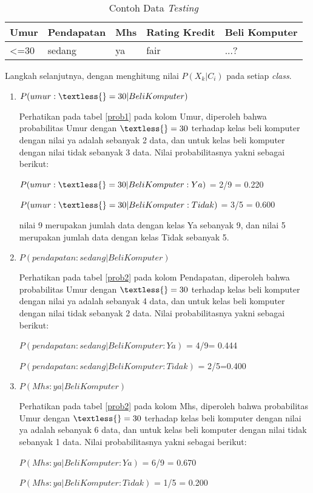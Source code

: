 \begin{table}[!ht]
\centering
\caption{Contoh Data \textit{Testing}}
\label{testing}
\begin{tabular}{|l|l|l|l|l|}
\hline
Umur           & Pendapatan & Mhs & Rating Kredit & Beli Komputer \\ \hline
\textless{}=30 & sedang     & ya  & fair          & ...?          \\ \hline
\end{tabular}
\end{table}
\par Langkah selanjutnya, dengan menghitung nilai $P(X_{k}|C_{i})$ pada setiap \textit{class}.

\begin{enumerate}
    \item $P(umur :\textless{}=30|Beli Komputer)$
    \par Perhatikan pada tabel \ref{prob1} pada kolom Umur, diperoleh bahwa probabilitas Umur dengan $\textless{}=30$ terhadap kelas beli komputer dengan nilai ya adalah sebanyak 2 data, dan untuk kelas beli komputer dengan nilai tidak sebanyak 3 data. Nilai probabilitasnya yakni sebagai berikut:
\par $P(umur :\textless{}=30|Beli Komputer:Ya)$ = 2/9 = 0.220
\par $P(umur :\textless{}=30|Beli Komputer:Tidak)$ = 3/5 = 0.600
\par nilai 9 merupakan jumlah data dengan kelas Ya sebanyak 9, dan nilai 5 merupakan jumlah data dengan kelas Tidak sebanyak 5.
\item $P(pendapatan :sedang|Beli Komputer)$
\par Perhatikan pada tabel \ref{prob2} pada kolom Pendapatan, diperoleh bahwa probabilitas Umur dengan $\textless{}=30$ terhadap kelas beli komputer dengan nilai ya adalah sebanyak 4 data, dan untuk kelas beli komputer dengan nilai tidak sebanyak 2 data. Nilai probabilitasnya yakni sebagai berikut:
\par $P(pendapatan :sedang|Beli Komputer:Ya)$ = 4/9= 0.444
\par $P(pendapatan :sedang|Beli Komputer:Tidak)$ = 2/5=0.400

\item $P(Mhs:ya|Beli Komputer)$
\par Perhatikan pada tabel \ref{prob2} pada kolom Mhs, diperoleh bahwa probabilitas Umur dengan $\textless{}=30$ terhadap kelas beli komputer dengan nilai ya adalah sebanyak 6 data, dan untuk kelas beli komputer dengan nilai tidak sebanyak 1 data. Nilai probabilitasnya yakni sebagai berikut:
\par $P(Mhs:ya|Beli Komputer:Ya)$ = 6/9 =  0.670 
\par $P(Mhs:ya|Beli Komputer:Tidak)$ = 1/5	 =  0.200


\end{enumerate}

